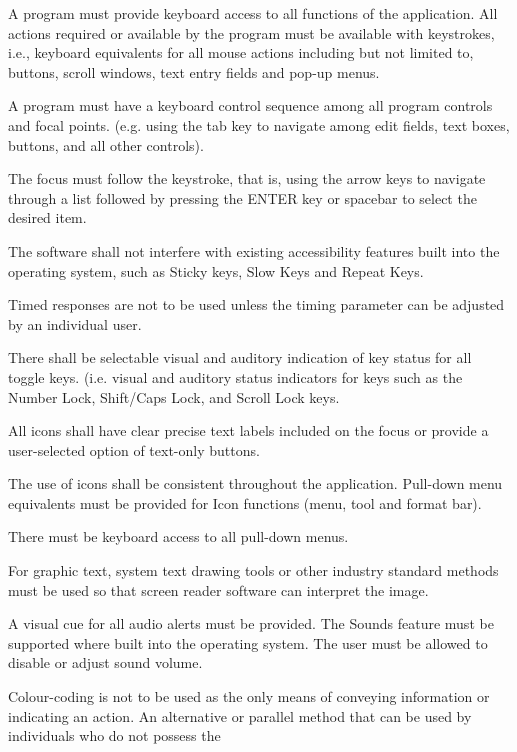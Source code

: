 \begin{itemize*}
\item A program must provide keyboard access to all functions of the
  application. All actions required or available by the program must
  be available with keystrokes, i.e., keyboard equivalents for all
  mouse actions including but not limited to, buttons, scroll windows,
  text entry fields and pop-up menus.
\item A program must have a keyboard control sequence among all
  program controls and focal points. (e.g. using the tab key to
  navigate among edit fields, text boxes, buttons, and all other
  controls).
\item The focus must follow the keystroke, that is, using the arrow
  keys to navigate through a list followed by pressing the ENTER key
  or spacebar to select the desired item.
\item The software shall not interfere with existing accessibility
  features built into the operating system, such as Sticky keys, Slow
  Keys and Repeat Keys.
\item Timed responses are not to be used unless the timing parameter
  can be adjusted by an individual user.
\item There shall be selectable visual and auditory indication of key
  status for all toggle keys. (i.e. visual and auditory status
  indicators for keys such as the Number Lock, Shift/Caps Lock, and
  Scroll Lock keys.
\item All icons shall have clear precise text labels included on the
  focus or provide a user-selected option of text-only buttons.
\item The use of icons shall be consistent throughout the application.
  Pull-down menu equivalents must be provided for Icon functions
  (menu, tool and format bar).
\item There must be keyboard access to all pull-down menus.
\item For graphic text, system text drawing tools or other industry
  standard methods must be used so that screen reader software can
  interpret the image.
\item A visual cue for all audio alerts must be provided. The Sounds
  feature must be supported where built into the operating system. The
  user must be allowed to disable or adjust sound volume.
\item Colour-coding is not to be used as the only means of conveying
  information or indicating an action. An alternative or parallel
  method that can be used by individuals who do not possess the

\end{itemize*}
